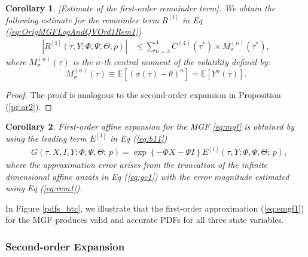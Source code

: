 \documentclass[pdftex,11pt,a4paper] {article}
\newtheorem{corollary}{Corollary}[section]
\begin{document}
\begin{corollary} \label {pr:ar1} [Estimate of the first-order remainder term]. We obtain the following estimate for the remainder term $R^{[1]}$ in Eq (\ref{eq:OrigMGFLogAndQVOrd1Rem1})
\begin{equation} \label {eq:rem1}
\begin{split}
\left| R^{[1]}(\tau,Y; \Phi,\Psi,\Theta;p) \right|  & \leq  \sum^{4}_{n=3}C^{(4)}(\tau^{*})\times M^{(n)}_{\sigma}(\tau^{*}),
\end{split}
\end{equation}
where $M^{(n)}_{\sigma}(\tau)$ is the $n$-th central moment of the volatility defined by:
\begin{equation}\label{eq:central_mom_vol}
M^{(n)}_{\sigma}(\tau) \equiv \mathbb{E}\left[(\sigma(\tau)-\theta)^n\right] = \mathbb{E}\left[Y^n(\tau)\right].
\end{equation}
\end{corollary}
\begin{proof}
The proof is analogous to the second-order expansion in Proposition (\ref{pr:ar2}).
\end{proof}

\begin{corollary} \label {pr:emgf1} First-order affine expansion for the MGF \eqref{eq:mgf} is obtained by using the leading term $E^{[1]}$ in Eq (\ref{eq:b11})
\begin{equation}\label{eq:emgf1}
\begin{split}
& G(\tau,X,I,Y; \Phi,\Psi,\Theta;\,p) = \exp \left\{-\Phi X-\Psi I \right\}  E^{[1]}(\tau,Y; \Phi,\Psi,\Theta;\,p),
\end{split}
\end{equation}
where the approximation error arises from the truncation of the infinite dimensional affine anzats in Eq (\ref{eq:gc1}) with the error magnitude estimated using Eq (\ref{eq:rem1}).
\end{corollary}

In Figure \ref{pdfs_btc}, we illustrate that the first-order approximation (\ref{eq:emgf1}) for the MGF produces valid and accurate PDFs for all three state variables.



\subsubsection{Second-order Expansion}
 
\end{document}
